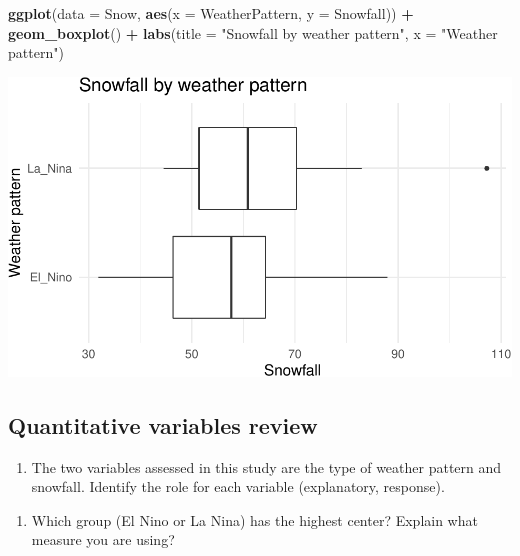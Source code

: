 \documentclass[
]{report}
\newenvironment{Shaded}{\begin{snugshade}}{\end{snugshade}}
\newcommand{\DataTypeTok}[1]{\textcolor[rgb]{0.13,0.29,0.53}{#1}}
\newcommand{\KeywordTok}[1]{\textcolor[rgb]{0.13,0.29,0.53}{\textbf{#1}}}
\newcommand{\NormalTok}[1]{#1}
\newcommand{\OperatorTok}[1]{\textcolor[rgb]{0.81,0.36,0.00}{\textbf{#1}}}
\newcommand{\StringTok}[1]{\textcolor[rgb]{0.31,0.60,0.02}{#1}}
\providecommand{\tightlist}{%
  \setlength{\itemsep}{0pt}\setlength{\parskip}{0pt}}
\begin{document}
\begin{Shaded}
\begin{Highlighting}[]
\KeywordTok{ggplot}\NormalTok{(}\DataTypeTok{data =}\NormalTok{ Snow,}
       \KeywordTok{aes}\NormalTok{(}\DataTypeTok{x =}\NormalTok{ WeatherPattern, }\DataTypeTok{y =}\NormalTok{ Snowfall)) }\OperatorTok{+}
\StringTok{    }\KeywordTok{geom\_boxplot}\NormalTok{() }\OperatorTok{+}\StringTok{ }
\StringTok{    }\KeywordTok{labs}\NormalTok{(}\DataTypeTok{title =} \StringTok{"Snowfall by weather pattern"}\NormalTok{,}
         \DataTypeTok{x =} \StringTok{"Weather pattern"}\NormalTok{)}
\end{Highlighting}
\end{Shaded}

\begin{center}\includegraphics[width=0.7\linewidth]{09-inference-2quant_files/figure-latex/unnamed-chunk-3-1} \end{center}

\hypertarget{quantitative-variables-review}{%
\subsection{Quantitative variables review}\label{quantitative-variables-review}}

\begin{enumerate}
\def\labelenumi{\arabic{enumi}.}
\tightlist
\item
  The two variables assessed in this study are the type of weather pattern and snowfall. Identify the role for each variable (explanatory, response).
\end{enumerate}

\vspace{1in}

\begin{enumerate}
\def\labelenumi{\arabic{enumi}.}
\setcounter{enumi}{1}
\tightlist
\item
  Which group (El Nino or La Nina) has the highest center? Explain what measure you are using?
\end{enumerate}
\end{document}
